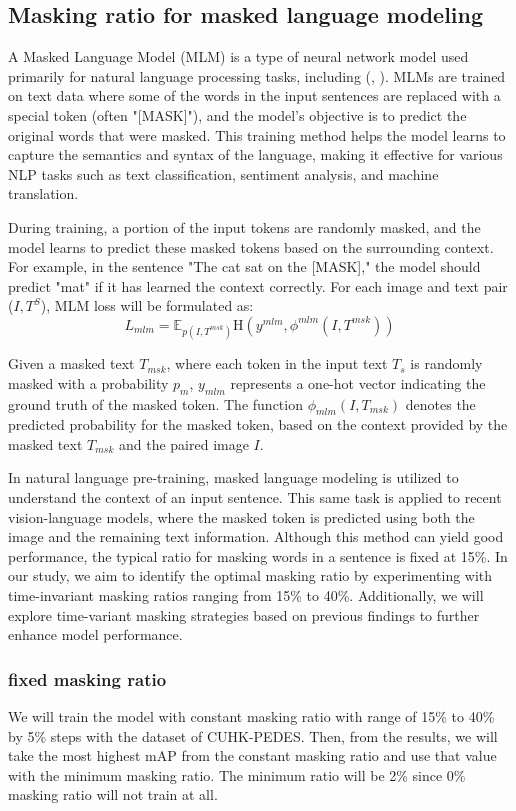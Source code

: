 \subsection{Masking ratio for masked language modeling} 
A Masked Language Model (MLM) is a type of neural network model used primarily for natural language processing tasks, including (\cite{devlin2018bert}, \cite{Bai2023RaSaRA}). MLMs are trained on text data where some of the words in the input sentences are replaced with a special token (often "[MASK]"), and the model's objective is to predict the original words that were masked. This training method helps the model learns to capture the semantics and syntax of the language, making it effective for various NLP tasks such as text classification, sentiment analysis, and machine translation.

During training, a portion of the input tokens are randomly masked, and the model learns to predict these masked tokens based on the surrounding context. For example, in the sentence "The cat sat on the [MASK]," the model should predict "mat" if it has learned the context correctly. For each image and text pair ($I,T^S$), MLM loss will be formulated as:
\[
  L_{mlm} = \mathbb{E}_{p \left( I,T^{msk}\right) }\mathrm{H}\left(y^{mlm}, \phi^{mlm}\left(I,T^{msk}\right)\right)
\]

Given a masked text \( T_{msk} \), where each token in the input text \( T_s \) is randomly masked with a probability \( p_m \), \( y_{mlm} \) represents a one-hot vector indicating the ground truth of the masked token. The function \( \phi_{mlm}(I, T_{msk}) \) denotes the predicted probability for the masked token, based on the context provided by the masked text \( T_{msk} \) and the paired image \( I \).

In natural language pre-training, masked language modeling is utilized to understand the context of an input sentence. This same task is applied to recent vision-language models, where the masked token is predicted using both the image and the remaining text information. Although this method can yield good performance, the typical ratio for masking words in a sentence is fixed at 15\%. In our study, we aim to identify the optimal masking ratio by experimenting with time-invariant masking ratios ranging from 15\% to 40\%. Additionally, we will explore time-variant masking strategies based on previous findings to further enhance model performance.

\subsubsection{fixed masking ratio}
We will train the model with constant masking ratio with range of 15\% to 40\% by 5\% steps with the dataset of CUHK-PEDES. Then, from the results, we will take the most highest mAP from the constant masking ratio and use that value with the minimum masking ratio. The minimum ratio will be 2\% since 0\% masking ratio will not train at all. 

